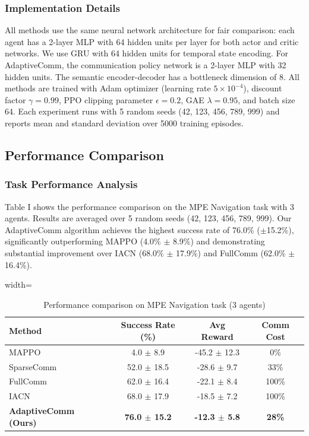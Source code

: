 \documentclass[10pt, twocolumn]{IEEEtran}
\begin{document}
\subsubsection{Implementation Details}
All methods use the same neural network architecture for fair comparison: each agent has a 2-layer MLP with 64 hidden units per layer for both actor and critic networks. We use GRU with 64 hidden units for temporal state encoding. For AdaptiveComm, the communication policy network is a 2-layer MLP with 32 hidden units. The semantic encoder-decoder has a bottleneck dimension of 8. All methods are trained with Adam optimizer (learning rate $5\times10^{-4}$), discount factor $\gamma=0.99$, PPO clipping parameter $\epsilon=0.2$, GAE $\lambda=0.95$, and batch size 64. Each experiment runs with 5 random seeds (42, 123, 456, 789, 999) and reports mean and standard deviation over 5000 training episodes.

\subsection{Performance Comparison}
\subsubsection{Task Performance Analysis}
Table I shows the performance comparison on the MPE Navigation task with 3 agents. Results are averaged over 5 random seeds (42, 123, 456, 789, 999). Our AdaptiveComm algorithm achieves the highest success rate of 76.0\% ($\pm$15.2\%), significantly outperforming MAPPO (4.0\% $\pm$ 8.9\%) and demonstrating substantial improvement over IACN (68.0\% $\pm$ 17.9\%) and FullComm (62.0\% $\pm$ 16.4\%).

\begin{table}[h]
\centering
\caption{Performance comparison on MPE Navigation task (3 agents)}
\begin{adjustbox}{width=\columnwidth}
\begin{tabular}{@{}lccc@{}}
\toprule
\textbf{Method} & \textbf{Success Rate (\%)} & \textbf{Avg Reward} & \textbf{Comm Cost} \\
\midrule
MAPPO & 4.0 $\pm$ 8.9 & -45.2 $\pm$ 12.3 & 0\% \\
SparseComm & 52.0 $\pm$ 18.5 & -28.6 $\pm$ 9.7 & 33\% \\
FullComm & 62.0 $\pm$ 16.4 & -22.1 $\pm$ 8.4 & 100\% \\
IACN & 68.0 $\pm$ 17.9 & -18.5 $\pm$ 7.2 & 100\% \\
\textbf{AdaptiveComm (Ours)} & \textbf{76.0 $\pm$ 15.2} & \textbf{-12.3 $\pm$ 5.8} & \textbf{28\%} \\
\bottomrule
\end{tabular}
\end{adjustbox}
\end{table}
\end{document}
